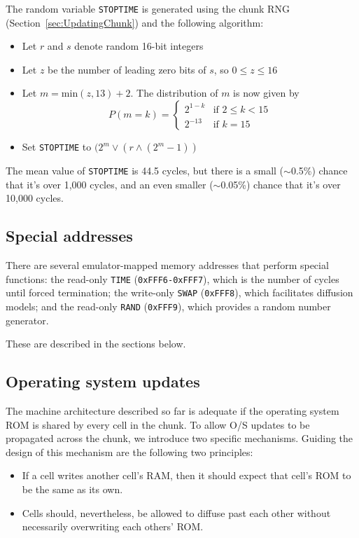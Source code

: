 \documentclass{article}
\newcommand\code[1]{{\tt #1}}
\newcommand\hex[1]{{\tt 0x#1}}
\newcommand\hexrange[2]{\hex{#1}{\tt -}\hex{#2}}
\begin{document}
The random variable \code{STOPTIME} is generated using the chunk RNG (Section~\ref{sec:UpdatingChunk})
and the following algorithm:
\begin{itemize}
\item Let $r$ and $s$ denote random 16-bit integers
\item Let $z$ be the number of leading zero bits of $s$, so $0 \leq z \leq 16$
\item Let $m = \mbox{min}(z,13) + 2$. The distribution of $m$ is now given by
  \[
  P(m=k) = \left\{ \begin{array}{ll} 2^{1-k} & \mbox{if $2 \leq k < 15$} \\ 2^{-13} & \mbox{if $k = 15$} \end{array} \right.
  \]
\item Set \code{STOPTIME} to $(2^m \vee (r \wedge (2^m - 1))$
\end{itemize}


The mean value of \code{STOPTIME} is 44.5 cycles,
but there is a small ($\sim$0.5\%) chance that it's over 1,000 cycles,
and an even smaller ($\sim$0.05\%) chance that it's over 10,000 cycles.

\subsection{Special addresses}

There are several emulator-mapped memory addresses that perform special functions:
the read-only \code{TIME} (\hexrange{FFF6}{FFF7}), which is the number of cycles until forced termination;
the write-only \code{SWAP} (\hex{FFF8}), which facilitates diffusion models;
and the read-only \code{RAND} (\hex{FFF9}), which provides a random number generator.

These are described in the sections below.

\subsection{Operating system updates}

The machine architecture described so far is adequate if the operating system ROM is shared by every cell in the chunk.
To allow O/S updates to be propagated across the chunk, we introduce two specific mechanisms.
Guiding the design of this mechanism are the following two principles:
\begin{itemize}
\item If a cell writes another cell's RAM, then it should expect that cell's ROM to be the same as its own.
\item Cells should, nevertheless, be allowed to diffuse past each other without necessarily overwriting each others' ROM.
\end{itemize}
\end{document}
